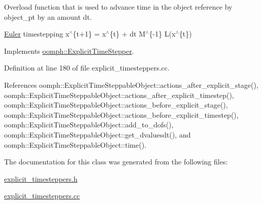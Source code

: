 Overload function that is used to advance time in the object reference by object\+\_\+pt by an amount dt. 

\hyperlink{classoomph_1_1Euler}{Euler} timestepping x$^\wedge$\{t+1\} = x$^\wedge$\{t\} + dt M$^\wedge$\{-\/1\} L(x$^\wedge$\{t\}) 

Implements \hyperlink{classoomph_1_1ExplicitTimeStepper_ab43bbab17960d0f50b8842e996f5c765}{oomph\+::\+Explicit\+Time\+Stepper}.



Definition at line 180 of file explicit\+\_\+timesteppers.\+cc.



References oomph\+::\+Explicit\+Time\+Steppable\+Object\+::actions\+\_\+after\+\_\+explicit\+\_\+stage(), oomph\+::\+Explicit\+Time\+Steppable\+Object\+::actions\+\_\+after\+\_\+explicit\+\_\+timestep(), oomph\+::\+Explicit\+Time\+Steppable\+Object\+::actions\+\_\+before\+\_\+explicit\+\_\+stage(), oomph\+::\+Explicit\+Time\+Steppable\+Object\+::actions\+\_\+before\+\_\+explicit\+\_\+timestep(), oomph\+::\+Explicit\+Time\+Steppable\+Object\+::add\+\_\+to\+\_\+dofs(), oomph\+::\+Explicit\+Time\+Steppable\+Object\+::get\+\_\+dvaluesdt(), and oomph\+::\+Explicit\+Time\+Steppable\+Object\+::time().



The documentation for this class was generated from the following files\+:\begin{DoxyCompactItemize}
\item 
\hyperlink{explicit__timesteppers_8h}{explicit\+\_\+timesteppers.\+h}\item 
\hyperlink{explicit__timesteppers_8cc}{explicit\+\_\+timesteppers.\+cc}\end{DoxyCompactItemize}
